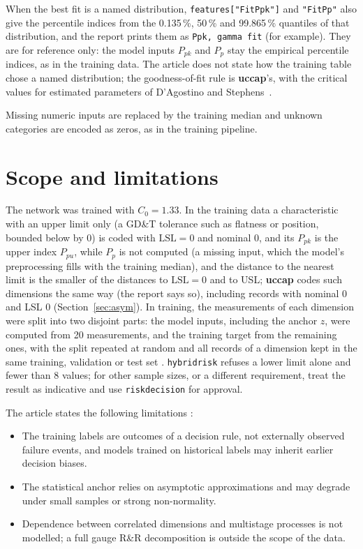 \documentclass[a4paper,11pt,oneside,openany,parskip=half-,headings=standardclasses,toc=flat,numbers=noenddot]{scrbook}
\newcommand{\code}[1]{\texttt{\begingroup\def\_{\textunderscore\allowbreak}#1\endgroup}}
\newcommand{\pkg}{\textsf{\bfseries uccap}}
\newcommand{\secref}[1]{Section~\ref{#1}}
\begin{document}
When the best fit is a named distribution, \code{features["Fit\_Ppk"]} and \code{"Fit\_Pp"} also give the
percentile indices from the 0.135\,\%, 50\,\% and 99.865\,\% quantiles of that distribution, and the report
prints them as \code{Ppk, gamma fit} (for example). They are for reference only: the model inputs $P_{pk}$ and
$P_p$ stay the empirical percentile indices, as in the training data. The article does not state how the
training table chose a named distribution; the goodness-of-fit rule is \pkg{}'s, with the critical values for
estimated parameters of D'Agostino and Stephens~\cite{dagostino-stephens}.

Missing numeric inputs are replaced by the training median and unknown categories are encoded as zeros, as in
the training pipeline.

\section{Scope and limitations}

\begin{caution}[Scope]
The network was trained with $C_0 = 1.33$. In the training data a characteristic with an upper limit only (a GD\&T
tolerance such as flatness or position, bounded below by 0) is coded with $\mathrm{LSL} = 0$ and nominal 0, and its
$P_{pk}$ is the upper index $P_{pu}$, while $P_p$ is not computed (a missing input, which the model's
preprocessing fills with the training median), and the distance to the nearest limit is the smaller of the
distances to $\mathrm{LSL} = 0$ and to USL; \pkg{} codes such dimensions the same way (the report says so), including
records with nominal 0 and LSL 0 (\secref{sec:asym}). In training, the measurements of each
dimension were split into two disjoint parts: the model inputs, including the anchor $z$, were computed from 20
measurements, and the training target from the remaining ones, with the split repeated at random and all records of a
dimension kept in the same training, validation or test set \cite[Sec.~7.5]{jy-hybrid}.
\code{hybrid\_risk} refuses a lower limit alone and fewer than 8 values; for other sample sizes, or a
different requirement, treat the result as indicative and use \code{risk\_decision} for approval.
\end{caution}

The article states the following limitations \cite[Sec.~7.2, 8]{jy-hybrid}:
\begin{itemize}
\item The training labels are outcomes of a decision rule, not externally observed failure events, and models
  trained on historical labels may inherit earlier decision biases.
\item The statistical anchor relies on asymptotic approximations and may degrade under small samples or strong
  non-normality.
\item Dependence between correlated dimensions and multistage processes is not modelled; a full gauge R\&R
  decomposition is outside the scope of the data.
\end{itemize}
\end{document}
